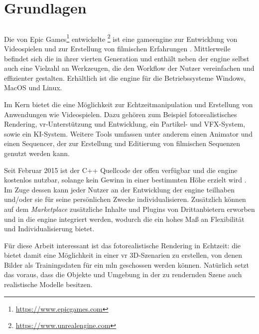 \graphicspath{{./images/}}      
\def\CHAPTERONE{./chapters/Chapter-1} 

\chapter{Grundlagen}
\label{chap:software}
%	
\glsresetall
\section{\unreal}
\label{sec:unrealengine}
Die von Epic Games\footnote{\url{https://www.epicgames.com}} entwickelte \unreal\footnote{\url{https://www.unrealengine.com}} ist eine \gls{gameengine} zur Entwicklung von Videospielen und zur Erstellung von filmischen Erfahrungen \cite{featUnreal}. Mittlerweile befindet sich die \unreal in ihrer vierten Generation und enthält neben der \acrshort{engine} selbst auch eine Vielzahl an Werkzeugen, die den Workflow der Nutzer vereinfachen und effizienter gestalten. Erhältlich ist die \acrshort{engine} für die Betriebssysteme Windows, MacOS und Linux. \par

Im Kern bietet die \unreal eine Möglichkeit zur Echtzeitmanipulation und Erstellung von Anwendungen wie Videospielen. Dazu gehören zum Beispiel fotorealistisches Rendering, \gls{vr}-Unterstützung und Entwicklung, ein Partikel- und VFX-System, sowie ein KI-System. Weitere Tools umfassen unter anderem einen Animator und einen Sequencer, der zur Erstellung und Editierung von filmischen Sequenzen genutzt werden kann. \par 

Seit Februar 2015 ist der C++ Quellcode der \unreal offen verfügbar und die \acrshort{engine} kostenlos nutzbar, solange kein Gewinn in einer bestimmten Höhe erzielt wird \cite{freeUnreal}. Im Zuge dessen kann jeder Nutzer an der Entwicklung der \acrshort{engine} teilhaben und/oder sie für seine persönlichen Zwecke individualisieren. Zusätzlich können auf dem \textit{Marketplace} zusätzliche Inhalte und Plugins von Drittanbietern erworben und in die \acrshort{engine} integriert werden, wodurch die \unreal ein hohes Maß an Flexibilität und Individualisierung bietet. \par 

Für diese Arbeit interessant ist das fotorealistische Rendering in Echtzeit: die \unreal bietet damit eine Möglichkeit in einer \acrfull{vr} 3D-Szenarien zu erstellen, von denen Bilder als Trainingsdaten für ein \gls{mln} geschossen werden können. Natürlich setzt das voraus, dass die Objekte und Umgebung in der zu rendernden Szene auch realistische Modelle besitzen.     

